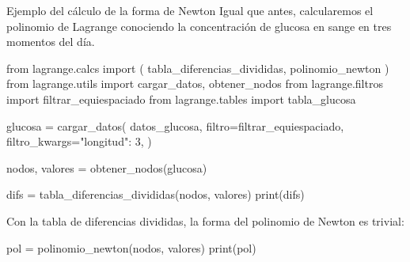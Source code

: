 \begin{frame}[fragile]{Ejemplo del cálculo de la forma de Newton}
  Igual que antes, calcularemos el polinomio de Lagrange conociendo la
  concentración de glucosa en sange en tres momentos del día.

  \begin{pycode}
    from lagrange.calcs import (
      tabla_diferencias_divididas,
      polinomio_newton
    )
    from lagrange.utils import cargar_datos, obtener_nodos
    from lagrange.filtros import filtrar_equiespaciado
    from lagrange.tables import tabla_glucosa

    glucosa = cargar_datos(
      datos_glucosa,
      filtro=filtrar_equiespaciado,
      filtro_kwargs={"longitud": 3},
    )

    nodos, valores = obtener_nodos(glucosa)
  \end{pycode}
  
  \begin{center}
    \begin{pycode}
      difs = tabla_diferencias_divididas(nodos, valores)
      print(difs)
    \end{pycode}
  \end{center}

  Con la tabla de diferencias divididas, la forma del polinomio de Newton
  es trivial:
  \begin{pycode}
    pol = polinomio_newton(nodos, valores)
    print(pol)
  \end{pycode}
\end{frame}

